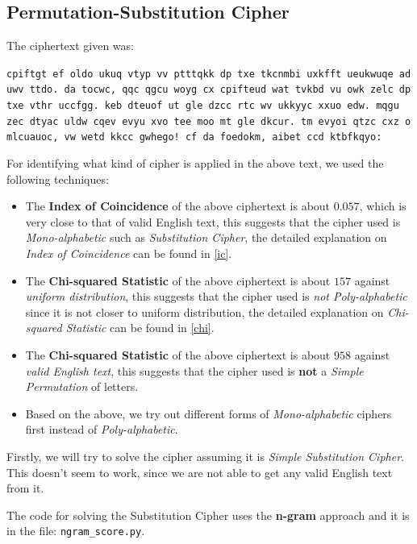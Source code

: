 \documentclass[10pt,twoside]{article}
\begin{document}
\subsection{Permutation-Substitution Cipher}
The ciphertext given was: \newline

\texttt{cpiftgt ef oldo ukuq vtyp vv ptttqkk dp txe tkcnmbi uxkfft ueukwuqe ad uwv ttdo. da tocwc, qqc qgcu woyg cx cpifteud wat tvkbd vu owk zelc dp txe vthr uccfgg. keb dteuof ut gle dzcc rtc wv ukkyyc xxuo edw. mqgu zec dtyac uldw cqev evyu xvo tee moo mt gle dkcur. tm evyoi qtzc cxz o mlcuauoc, vw wetd kkcc gwhego! cf da foedokm, aibet ccd ktbfkqyo:} \newline

For identifying what kind of cipher is applied in the above text, we used the following techniques:

\begin{itemize}
  \setlength\itemsep{0em}
  \item The \textbf{Index of Coincidence} of the above ciphertext is about $0.057$, which is very close to that of valid English text, this suggests that the cipher used is \textit{Mono-alphabetic} such as \textit{Substitution Cipher}, the detailed explanation on \textit{Index of Coincidence} can be found in \cref{ic}.
  \item The \textbf{Chi-squared Statistic} of the above ciphertext is about $157$ against \textit{uniform distribution}, this suggests that the cipher used is \textit{not Poly-alphabetic} since it is not closer to uniform distribution, the detailed explanation on \textit{Chi-squared Statistic} can be found in \cref{chi}.
  \item The \textbf{Chi-squared Statistic} of the above ciphertext is about $958$ against \textit{valid English text}, this suggests that the cipher used is \textbf{not} a \textit{Simple Permutation} of letters.
  \item Based on the above, we try out different forms of \textit{Mono-alphabetic} ciphers first instead of \textit{Poly-alphabetic}.
\end{itemize}

Firstly, we will try to solve the cipher assuming it is \textit{Simple Substitution Cipher}. This doesn't seem to work, since we are not able to get any valid English text from it. \newline

The code for solving the Substitution Cipher uses the \textbf{n-gram} approach and it is in the file: \texttt{ngram\_score.py}. \newline
\end{document}
